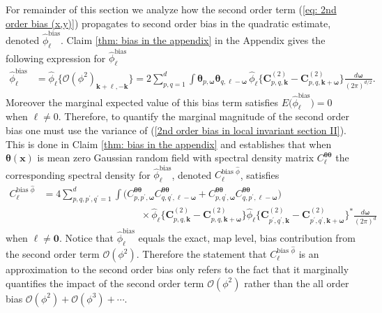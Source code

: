 \documentclass[10pt,noinfoline]{imsart}
\newcommand{\bs}{\boldsymbol}
\begin{document}
For remainder of this section we analyze how the second order term (\ref{eq: 2nd order bias (x,y)}) propagates to second order bias in the quadratic estimate, denoted $\hat\phi_{\bs \ell}^{\text{bias}}$. 
Claim \ref{thm: bias in the appendix} in the Appendix gives the following expression for $\hat\phi_{\bs \ell}^{\text{bias}}$
\begin{align}
    \label{2nd order bias in local invariant section II}
    \hat\phi_{\bs \ell}^{\text{bias}}&=\hat\phi_{\bs \ell}\big\{\mathcal O(\phi^2)_{\bs k+\bs \ell, -\bs k}\big\} =  2\sum_{p,q=1}^d\int  \bs\theta_{p,\bs\omega}\bs\theta_{q,\bs \ell - \bs\omega}\, \hat\phi_{\bs \ell}\big\{{\bs C^{(2)}_{p,q,\bs k}}- {\bs C^{(2)}_{p,q,\bs k + \bs\omega}}\big\}\frac{d\bs\omega}{(2\pi)^{d/2}}.
\end{align}
Moreover the marginal expected value of this bias term satisfies $E\big( \hat\phi_{\bs \ell}^{\text{bias}} \big) = 0$
when $\bs \ell \neq 0$. Therefore, to quantify the marginal magnitude of the second order bias one must use the variance of (\ref{2nd order bias in local invariant section II}). This is done in  Claim \ref{thm: bias in the appendix} and establishes that when $\bs\theta(\bs x)$ is mean zero Gaussian random field with spectral density matrix $C_{\bs \ell}^{\bs \theta\bs\theta}$ the corresponding spectral density for $\hat\phi_{\bs \ell}^{\text{bias}}$, denoted $C_{\bs \ell}^{\text{bias }\hat\phi}$, satisfies
\begin{align}
	C_{\bs \ell}^{\text{bias }\hat\phi}
	&= 4\!\! \sum_{p,q,p^\prime\!,q^\prime\!=1}^d \int 
	\Big(
	C^{\bs \theta\bs \theta}_{p,p^\prime,\bs \omega}C^{\bs \theta\bs \theta}_{q,q^\prime,\bs \ell - \bs \omega}
	+ C^{\bs \theta\bs \theta}_{p,q^\prime,\bs \omega}C^{\bs \theta\bs \theta}_{q,p^\prime,\bs \ell - \bs \omega}
	\Big)\nonumber
	\\
	&\qquad\qquad\qquad\qquad\qquad\times
	\hat\phi_{\bs \ell}\big\{{\bs C^{(2)}_{p,q,\bs k}}- {\bs C^{(2)}_{p,q,\bs k + \bs\omega}}\big\}
	\hat\phi_{\bs \ell}\big\{{\bs C^{(2)}_{p^\prime,q^\prime,\bs k}}- {\bs C^{(2)}_{p^\prime,q^\prime,\bs k + \bs\omega}}\big\}^*\frac{d\bs\omega}{(2\pi)^{d}}
	\label{eq in intro on spec den of O(phi2)}
\end{align}
when $\bs \ell \neq \bs 0$.
Notice that $\hat\phi_{\bs \ell}^{\text{bias}}$ equals the exact, map level, bias contribution from the second order term $\mathcal O(\phi^2)$. Therefore the statement that $C_{\bs \ell}^{\text{bias }\hat\phi}$ is an approximation  to the second order bias only refers to the fact that it marginally quantifies the impact of the second order term $\mathcal O(\phi^2)$ rather than the all order bias $\mathcal O(\phi^2) + \mathcal O(\phi^3) + \cdots$. 
\end{document}
